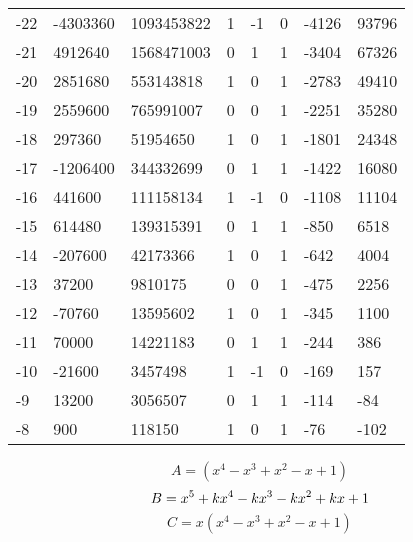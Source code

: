 \documentclass{amsart}
\begin{document}
\begin{longtable}{|l|l|l|lllll|}
-22&-4303360&1093453822&1&-1&0&-4126&93796\\
-21&4912640&1568471003&0&1&1&-3404&67326\\
-20&2851680&553143818&1&0&1&-2783&49410\\
-19&2559600&765991007&0&0&1&-2251&35280\\
-18&297360&51954650&1&0&1&-1801&24348\\
-17&-1206400&344332699&0&1&1&-1422&16080\\
-16&441600&111158134&1&-1&0&-1108&11104\\
-15&614480&139315391&0&1&1&-850&6518\\
-14&-207600&42173366&1&0&1&-642&4004\\
-13&37200&9810175&0&0&1&-475&2256\\
-12&-70760&13595602&1&0&1&-345&1100\\
-11&70000&14221183&0&1&1&-244&386\\
-10&-21600&3457498&1&-1&0&-169&157\\
-9&13200&3056507&0&1&1&-114&-84\\
-8&900&118150&1&0&1&-76&-102\\
\hline
\end{longtable}
$$A=(x^4
 - x^3
 + x^2
 - x
 + 1)$$
$$B=x^5
 + k\*x^4
 - k\*x^3
 - k\*x^2
 + k\*x
 + 1$$
$$C=x(x^4
 - x^3
 + x^2
 - x
 + 1)$$
\end{document}
